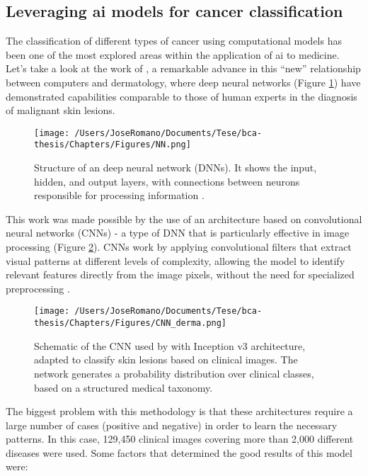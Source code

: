 \subsection{Leveraging \gls{ai} models for cancer classification}

The classification of different types of cancer using computational models has
been one of the most explored areas within the application of \gls{ai} to
medicine. Let's take a look at the work of
\textcite{ai_in_dermacancer_esteva2017}, a remarkable advance in this “new”
relationship between computers and dermatology, where deep neural networks
(Figure \ref{fig:DNN}) have demonstrated capabilities comparable to those of
human experts in the diagnosis of malignant skin lesions.

\begin{figure}[htbp]
  \centering
  \texttt{[image: /Users/JoseRomano/Documents/Tese/bca-thesis/Chapters/Figures/NN.png]}
  \caption{Structure of an deep neural network (DNNs). It shows the input, hidden, and output layers, with connections between neurons responsible for processing information \cite{analyticsvidhya_image}.}
  \label{fig:DNN}
\end{figure}

This work was made possible by the use of an architecture based on
convolutional neural networks (CNNs) - a type of DNN that is particularly
effective in image processing (Figure \ref{fig:CNN_derma}). CNNs work by
applying convolutional filters that extract visual patterns at different levels
of complexity, allowing the model to identify relevant features directly from
the image pixels, without the need for specialized preprocessing
\cite{CNN_Albawi2017}.

\begin{figure}[htbp]
  \centering
  \texttt{[image: /Users/JoseRomano/Documents/Tese/bca-thesis/Chapters/Figures/CNN\_derma.png]}
  \caption{Schematic of the CNN used by \textcite{ai_in_dermacancer_esteva2017} with Inception v3 architecture, adapted to classify skin lesions based on clinical images. The network generates a probability distribution over clinical classes, based on a structured medical taxonomy.}
  \label{fig:CNN_derma}
\end{figure}

The biggest problem with this methodology is that these architectures require a
large number of cases (positive and negative) in order to learn the necessary
patterns. In this case, 129{,}450 clinical images covering more than 2{,}000
different diseases were used. Some factors that determined the good results of
this model were:


